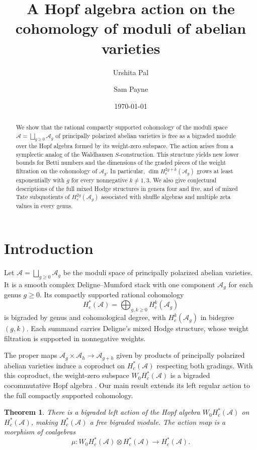 \documentclass[12 pt]{amsart}
\title[A Hopf algebra action on cohomology]{A Hopf algebra action on the cohomology of moduli of abelian varieties}
\author{Urshita Pal}
\author{Sam Payne}
\date{\today}
\newcommand{\cA}{\mathcal{A}}
\newcommand{\<}{\langle}
\renewcommand{\>}{\rangle}
\newtheorem{theorem}{Theorem}[section]
\theoremstyle{definition}
\begin{document}
\begin{abstract}
We show that the rational compactly supported cohomology of the moduli space $\cA = \bigsqcup_{g \geq 0} \cA_g$ of principally polarized abelian varieties is free as a bigraded module over the Hopf algebra formed by its weight-zero subspace. The action arises from a symplectic analog of the Waldhausen $S$-construction. This structure yields new lower bounds for Betti numbers and the dimensions of the graded pieces of the weight filtration on the cohomology of $\cA_g$. In particular, $\dim H_c^{2g + k}(\cA_g)$ grows at least exponentially with $g$ for every nonnegative $k \neq 1, 3$. We also give conjectural descriptions of the full mixed Hodge structures in genera four and five, and of mixed Tate subquotients of $H_c^{2g}(\cA_g)$ associated with shuffle algebras and multiple zeta values in every genus.
\end{abstract}

\maketitle

\setcounter{tocdepth}{1}
{\small\tableofcontents}


\section{Introduction}\label{sec:intro}


Let $\cA = \bigsqcup_{g \geq 0} \cA_g$ be the moduli space of principally polarized abelian varieties. It is a smooth complex Deligne--Mumford stack with one component $\cA_g$ for each genus $g \geq 0$. Its compactly supported rational cohomology
\[
H_c^*(\cA) = \bigoplus_{g, k \geq 0} H_c^k(\cA_g)
\]
is bigraded by genus and cohomological degree, with $H_c^k(\cA_g)$ in bidegree $(g, k)$. Each summand carries Deligne's mixed Hodge structure, whose weight filtration is supported in nonnegative weights.

The proper maps $\cA_g \times \cA_h \to \cA_{g + h}$ given by products of principally polarized abelian varieties induce a coproduct on $H_c^*(\cA)$ respecting both gradings. With this coproduct, the weight-zero subspace $W_0 H_c^*(\cA)$ is a bigraded cocommutative Hopf algebra \cite{BCGP}. Our main result extends its left regular action to the full compactly supported cohomology.

\begin{theorem}\label{thm:free-module}
There is a bigraded left action of the Hopf algebra $W_0 H_c^*(\cA)$ on $H_c^*(\cA)$, making $H_c^*(\cA)$ a free bigraded module. The action map is a morphism of coalgebras
\[
\mu \colon W_0 H_c^*(\cA) \otimes H_c^*(\cA) \longrightarrow H_c^*(\cA).
\]
\end{theorem}
\end{document}
